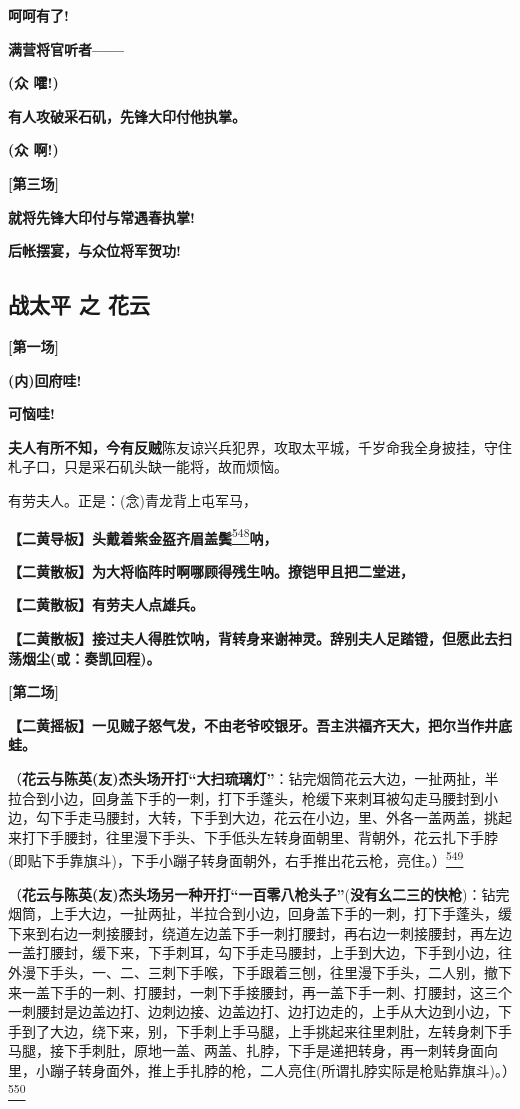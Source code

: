 \textbf{呵呵有了!}

\textbf{满营将官听者------}

\textbf{(众 嚯!)}

\textbf{有人攻破采石矶，先锋大印付他执掌。}

\textbf{(众 啊!)}

\textbf{{[}第三场{]}}

\textbf{就将先锋大印付与常遇春执掌!}

\textbf{后帐摆宴，与众位将军贺功!}

\hypertarget{ux6218ux592aux5e73-ux4e4b-ux82b1ux4e91}{%
\subsection{战太平 之
花云}\label{ux6218ux592aux5e73-ux4e4b-ux82b1ux4e91}}

\textbf{{[}第一场{]}}

\textbf{(内)回府哇!}

\textbf{可恼哇!}

\textbf{夫人有所不知，今有反贼}陈友谅兴兵犯界，攻取太平城，千岁命我全身披挂，守住札子口，只是采石矶头缺一能将，故而烦恼。

有劳夫人。正是：(念)青龙背上屯军马，

\textbf{【二黄导板】头戴着紫金盔齐眉盖鬓}\protect\hyperlink{fn548}{\textsuperscript{548}}\textbf{呐，}

\textbf{【二黄散板】为大将临阵时啊哪顾得残生呐。撩铠甲且把二堂进，}

\textbf{【二黄散板】有劳夫人点雄兵。}

\textbf{【二黄散板】接过夫人得胜饮呐，背转身来谢神灵。辞别夫人足踏镫，但愿此去扫荡烟尘(或：奏凯回程)。}

\textbf{{[}第二场{]}}

\textbf{【二黄摇板】一见贼子怒气发，不由老爷咬银牙。吾主洪福齐天大，把尔当作井底蛙。}

（\textbf{花云与陈英(友)杰头场开打``大扫琉璃灯''}：钻完烟筒花云大边，一扯两扯，半拉合到小边，回身盖下手的一刺，打下手蓬头，枪缓下来刺耳被勾走马腰封到小边，勾下手走马腰封，大转，下手到大边，花云在小边，里、外各一盖两盖，挑起来打下手腰封，往里漫下手头、下手低头左转身面朝里、背朝外，花云扎下手脖(即贴下手靠旗斗)，下手小蹦子转身面朝外，右手推出花云枪，亮住。）\protect\hyperlink{fn549}{\textsuperscript{549}}

（\textbf{花云与陈英(友)杰头场另一种开打``一百零八枪头子''}(\textbf{没有幺二三的快枪})：钻完烟筒，上手大边，一扯两扯，半拉合到小边，回身盖下手的一刺，打下手蓬头，缓下来到右边一刺接腰封，绕道左边盖下手一刺打腰封，再右边一刺接腰封，再左边一盖打腰封，缓下来，下手刺耳，勾下手走马腰封，上手到大边，下手到小边，往外漫下手头，一、二、三刺下手喉，下手跟着三刨，往里漫下手头，二人别，撤下来一盖下手的一刺、打腰封，一刺下手接腰封，再一盖下手一刺、打腰封，这三个一刺腰封是边盖边打、边刺边接、边盖边打、边打边走的，上手从大边到小边，下手到了大边，绕下来，别，下手刺上手马腿，上手挑起来往里刺肚，左转身刺下手马腿，接下手刺肚，原地一盖、两盖、扎脖，下手是递把转身，再一刺转身面向里，小蹦子转身面外，推上手扎脖的枪，二人亮住(所谓扎脖实际是枪贴靠旗斗)。）\protect\hyperlink{fn550}{\textsuperscript{550}}

